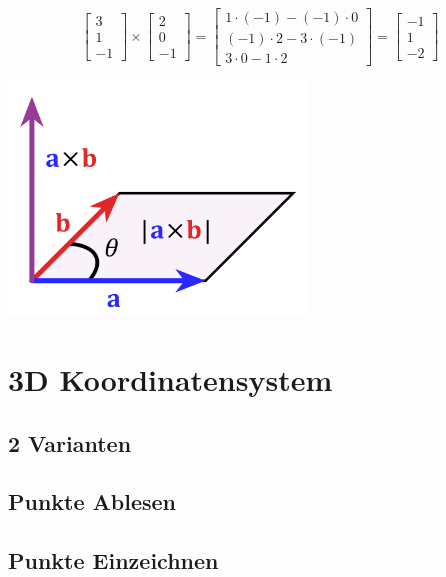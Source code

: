 \begin{equation*}
    \begin{bmatrix}
        3 \\
        1 \\
        -1
    \end{bmatrix} \times
    \begin{bmatrix}
        2 \\
        0 \\
        -1
    \end{bmatrix} =
    \begin{bmatrix}
        1 \cdot (-1) - (-1) \cdot 0 \\
        (-1) \cdot 2 - 3 \cdot (-1) \\
        3 \cdot 0 - 1 \cdot 2
    \end{bmatrix} =
    \begin{bmatrix}
        -1 \\
        1 \\
        -2
    \end{bmatrix}
\end{equation*}

\begin{center}
    \includegraphics[width=0.6\textwidth]{images/cross-p.png}
\end{center}


\section{3D Koordinatensystem}
\subsection{2 Varianten}
\subsection{Punkte Ablesen}
\subsection{Punkte Einzeichnen}

